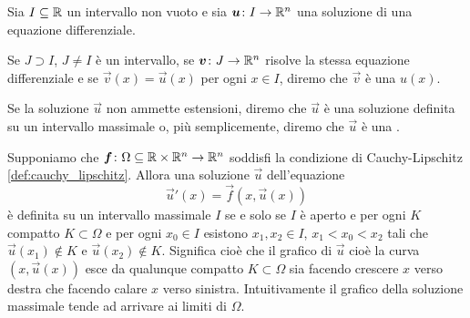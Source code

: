\begin{definition}
Sia $I\subseteq \mathbb R$ un intervallo non vuoto e sia $\boldsymbol u \colon I \to \mathbb R^n$
una soluzione di una equazione differenziale.

Se $J\supset I$, $J \neq I$ è un intervallo, se $\boldsymbol v\colon J \to \mathbb R^n$
risolve la stessa equazione differenziale
e se $\vec v(x)=\vec u(x)$ per ogni $x\in I$,
diremo che $\vec v$ è una  $u(x)$.

Se la soluzione $\vec u$ non ammette estensioni, diremo che $\vec u$ è una
soluzione definita su un intervallo massimale o, più semplicemente, diremo
che $\vec u$ è una .
\end{definition}

\begin{proposition}
\label{prop:edo_massimale}
Supponiamo che $\boldsymbol f\colon \Omega\subseteq \mathbb R\times\mathbb R^n\to\mathbb R^n$
soddisfi la condizione di Cauchy-Lipschitz \ref{def:cauchy_lipschitz}.
Allora una soluzione $\vec u$ dell'equazione
\begin{equation}\label{eq:edo_normale_ordine_uno}
  \vec u'(x) = \vec f(x, \vec u(x))
\end{equation}
è definita su un intervallo massimale $I$ se e solo se
$I$ è aperto e per ogni $K$ compatto $K\subset \Omega$
e per ogni $x_0 \in I$ esistono $x_1,x_2\in I$, $x_1 < x_0 < x_2$ tali che $\vec u(x_1)\not \in K$ e $\vec u(x_2) \not \in K$.
Significa cioè che il grafico di $\vec u$ cioè la curva $(x,\vec u(x))$ esce da qualunque compatto  $K\subset \Omega$ sia facendo crescere $x$ verso destra che facendo calare $x$ verso sinistra.
Intuitivamente il grafico della soluzione massimale tende ad arrivare ai limiti di $\Omega$.
\end{proposition}
%

